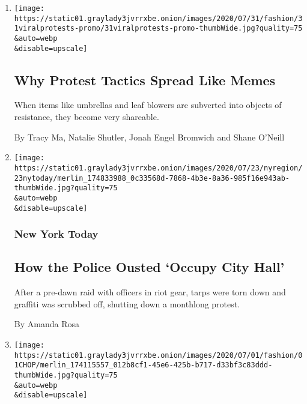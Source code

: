 \begin{enumerate}
\def\labelenumi{\arabic{enumi}.}
\item
  \href{/2020/07/31/style/viral-protest-videos.html}{}

  \texttt{[image: https://static01.graylady3jvrrxbe.onion/images/2020/07/31/fashion/31viralprotests-promo/31viralprotests-promo-thumbWide.jpg?quality=75\\\&auto=webp\\\&disable=upscale]}

  \hypertarget{why-protest-tactics-spread-like-memes}{%
  \subsection{Why Protest Tactics Spread Like
  Memes}\label{why-protest-tactics-spread-like-memes}}

  When items like umbrellas and leaf blowers are subverted into objects
  of resistance, they become very shareable.

  By Tracy Ma, Natalie Shutler, Jonah Engel Bromwich and Shane O'Neill
\item
  \href{/2020/07/23/nyregion/occupy-city-hall-nyc.html}{}

  \texttt{[image: https://static01.graylady3jvrrxbe.onion/images/2020/07/23/nyregion/23nytoday/merlin\_174833988\_0c33568d-7868-4b3e-8a36-985f16e943ab-thumbWide.jpg?quality=75\\\&auto=webp\\\&disable=upscale]}

  \hypertarget{new-york-today}{%
  \subsubsection{New York Today}\label{new-york-today}}

  \hypertarget{how-the-police-ousted-occupy-city-hall}{%
  \subsection{How the Police Ousted `Occupy City
  Hall'}\label{how-the-police-ousted-occupy-city-hall}}

  After a pre-dawn raid with officers in riot gear, tarps were torn down
  and graffiti was scrubbed off, shutting down a monthlong protest.

  By Amanda Rosa
\item
  \href{/2020/07/01/style/autonomous-zone-anarchist-community.html}{}

  \texttt{[image: https://static01.graylady3jvrrxbe.onion/images/2020/07/01/fashion/01CHOP/merlin\_174115557\_012b8cf1-45e6-425b-b717-d33bf3c83ddd-thumbWide.jpg?quality=75\\\&auto=webp\\\&disable=upscale]}


\end{enumerate}
